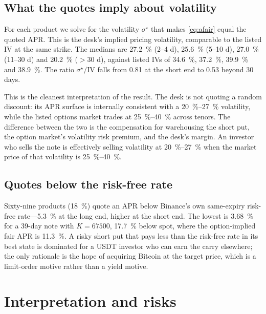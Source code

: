 \documentclass[11pt]{article}
\begin{document}
\subsection{What the quotes imply about volatility}

For each product we solve for the volatility $\sigma^\star$ that makes \eqref{eq:afair} equal the quoted APR. This is the desk's implied pricing volatility, comparable to the listed IV at the same strike. The medians are \SI{27.2}{\percent} (2--4 d), \SI{25.6}{\percent} (5--10 d), \SI{27.0}{\percent} (11--30 d) and \SI{20.2}{\percent} ($>$30 d), against listed IVs of \SI{34.6}{\percent}, \SI{37.2}{\percent}, \SI{39.9}{\percent} and \SI{38.9}{\percent}. The ratio $\sigma^\star/\text{IV}$ falls from \num{0.81} at the short end to \num{0.53} beyond 30 days.

This is the cleanest interpretation of the result. The desk is not quoting a random discount: its APR surface is internally consistent with a \SI{20}{\percent}--\SI{27}{\percent} volatility, while the listed options market trades at \SI{25}{\percent}--\SI{40}{\percent} across tenors. The difference between the two is the compensation for warehousing the short put, the option market's volatility risk premium, and the desk's margin. An investor who sells the note is effectively selling volatility at \SI{20}{\percent}--\SI{27}{\percent} when the market price of that volatility is \SI{25}{\percent}--\SI{40}{\percent}.

\subsection{Quotes below the risk-free rate}

Sixty-nine products (\SI{18}{\percent}) quote an APR below Binance's own same-expiry risk-free rate---\SI{5.3}{\percent} at the long end, higher at the short end. The lowest is \SI{3.68}{\percent} for a 39-day note with $K=\num{67500}$, \SI{17.7}{\percent} below spot, where the option-implied fair APR is \SI{11.3}{\percent}. A risky short put that pays less than the risk-free rate in its best state is dominated for a USDT investor who can earn the carry elsewhere; the only rationale is the hope of acquiring Bitcoin at the target price, which is a limit-order motive rather than a yield motive.

\section{Interpretation and risks}\label{sec:interpretation}
\end{document}
